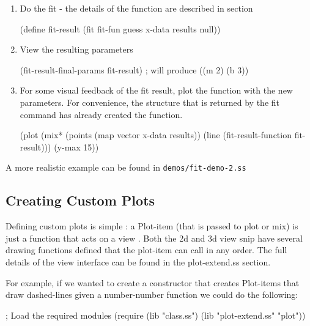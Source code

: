 \documentclass{article}
\begin{document}
{\begin{enumerate}
\item Do the fit - the details of the function are described in  section
\begin{schemedisplay}

(define fit-result (fit fit-fun guess x-data results null))
\end{schemedisplay}

\item View the resulting parameters
\begin{schemedisplay}

(fit-result-final-params fit-result) ; will produce ((m 2) (b 3))         
         
\end{schemedisplay}

\item For some visual feedback of the fit result, plot the function 
         with the new parameters. For convenience, the structure that is returned
         by the fit command has already created the function.
\begin{schemedisplay}

(plot (mix* 
        (points (map vector x-data results))
        (line (fit-result-function fit-result)))
      (y-max 15))
\end{schemedisplay}

\end{enumerate}

A more realistic example can be found in {\tt demos/fit-demo-2.ss}

\subsection{Creating Custom Plots}


Defining custom plots is simple : a Plot-item (that is passed to plot or mix) is just a function
       that acts on a  {view }. Both the 2d and 3d view snip have several drawing functions defined that
       the plot-item can call in any order. The full details of the view interface can be found in the
        {plot-extend.ss} section. 


For example, if we wanted to create a constructor that creates Plot-items that 
       draw dashed-lines given a number-number function we could do the following:
\begin{schemedisplay}
; Load the required modules
(require (lib "class.ss")
         (lib "plot-extend.ss" "plot"))



\end{schemedisplay}}
\end{document}
